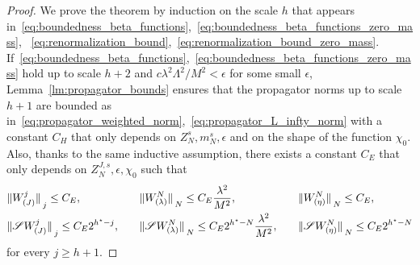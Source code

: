 \documentclass[a4paper, 11pt]{article}
\newcommand{\cutoff}{\Lambda}								%
\newcommand{\sing}[2]{{#1}^{#2}}							%
\theoremstyle{thm}
\begin{document}
\begin{proof}
We prove the theorem by induction on the scale $h$ that appears in~\eqref{eq:boundedness_beta_functions},~\eqref{eq:boundedness_beta_functions_zero_mass},%
~\eqref{eq:renormalization_bound},~\eqref{eq:renormalization_bound_zero_mass}. If~\eqref{eq:boundedness_beta_functions},~\eqref{eq:boundedness_beta_functions_zero_mass} hold up to scale $h+2$ and $c \lambda^2 \cutoff^2/M^2 < \epsilon$ for some small $\epsilon$, Lemma~\ref{lm:propagator_bounds} ensures that the propagator norms up to scale $h+1$ are bounded as in~\eqref{eq:propagator_weighted_norm},~\eqref{eq:propagator_L_infty_norm} with a constant $C_H$ that only depends on $Z^s_N, m^s_N, \epsilon$ and on the shape of the function $\chi_0$. Also, thanks to the same inductive assumption, there exists a constant $C_E$ that only depends on $Z^{J, s}_N, \epsilon, \chi_0$ such that
\begin{alignat}{3}
\label{eq:th:bounds_endpoints}
& \norm*{\sing{W}{j}_{(J)}}_j \le C_E,
&& \quad \norm*{\sing{W}{N}_{(\lambda)}}_N \le C_E \frac{\lambda^2}{M^2},
&& \quad \norm*{\sing{W}{N}_{(\eta)}}_N \le C_E, \\
\label{eq:th:bounds_endpoints_zero_mass}
& \norm*{\mathscr{S} \sing{W}{j}_{(J)}}_j \le C_E 2^{h^\star - j},
&& \quad \norm*{\mathscr{S} \sing{W}{N}_{(\lambda)}}_N \le C_E 2^{h^\star - N} \frac{\lambda^2}{M^2},
&& \quad \norm*{\mathscr{S} \sing{W}{N}_{(\eta)}}_N \le C_E 2^{h^\star - N}
\end{alignat}
for every $j \ge h+1$.


\end{proof}
\end{document}
